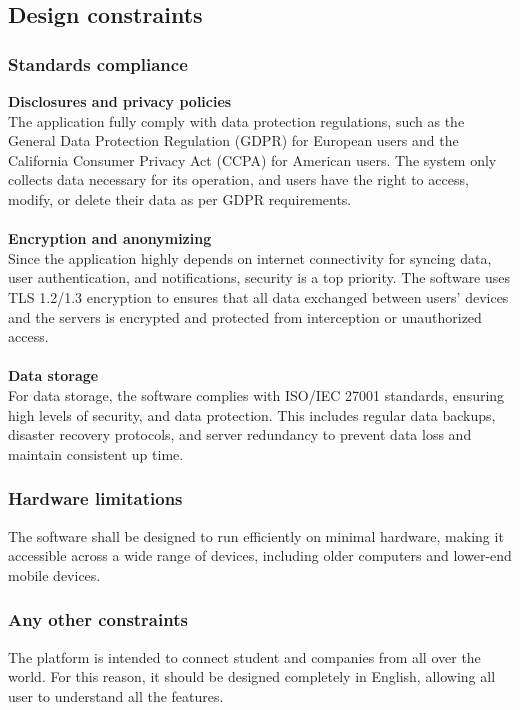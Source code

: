 \documentclass[11pt,twoside]{article}
\begin{document}
	\subsection{Design constraints}	
		\subsubsection{Standards compliance}

\textbf{Disclosures and privacy policies} \\
The application fully comply with data protection regulations, such as the General Data Protection Regulation (GDPR) for European users and the California Consumer Privacy Act (CCPA) for American users. The system only collects data necessary for its operation, and users have the right to access, modify, or delete their data as per GDPR requirements.\\
\\
\textbf{Encryption and anonymizing} \\
Since the application highly depends on internet connectivity for syncing data, user authentication, and notifications, security is a top priority. The software uses TLS 1.2/1.3 encryption to ensures that all data exchanged between users’ devices and the servers is encrypted and protected from interception or unauthorized access.\\
\\
\textbf{Data storage} \\
For data storage, the software complies with ISO/IEC 27001 standards, ensuring high levels of security, and data protection. This includes regular data backups, disaster recovery protocols, and server redundancy to prevent data loss and maintain consistent up time.
		
		\subsubsection{Hardware limitations}

The software shall be designed to run efficiently on minimal hardware, making it accessible across a wide range of devices, including older computers and lower-end mobile devices.
		
		\subsubsection{Any other constraints}
		
The platform is intended to connect student and companies from all over the world. For this reason, it should be designed completely in English, allowing all user to understand all the features.
		
\end{document}
